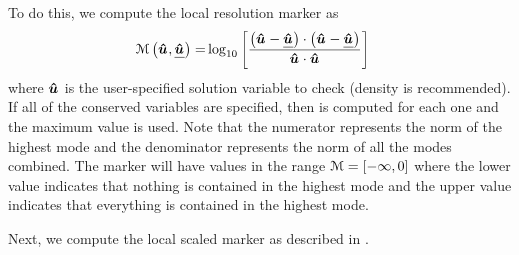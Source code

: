 To do this, we compute the local resolution marker
as\cite{Persson_2006,Barter_2007,Barter_2008}
\begin{align}
    \label{EQN:ResolutionMarker}
    \marker \left( \bm{\uModal[]} , \bm{\underline{\uModal[]}} \right)
 =& \log_{10}
    \left[
      \frac{
        \left( \bm{\uModal[]} - \bm{\underline{\uModal[]}} \right) \cdot
        \left( \bm{\uModal[]} - \bm{\underline{\uModal[]}} \right)
      }{
               \bm{\uModal[]} \cdot        \bm{\uModal[]}
      }
    \right]
\end{align}
where $\bm{\uModal[]}$ is the user-specified solution variable
to check (density is recommended).
%
If all of the conserved variables are specified, then
 is computed for each one and the
maximum value is used.
%
Note that the numerator represents the norm of the highest mode
and the denominator represents the norm of all the modes combined.
%
The marker will have values in the range $\marker = [-\infty,0]$ where
the lower value indicates that nothing is contained in the highest mode and 
the upper value indicates that everything is contained in the highest mode.


Next, we compute the local scaled marker as described in .







